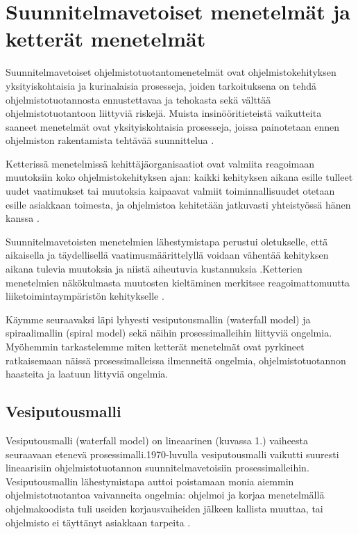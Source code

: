 \documentclass[finnish]{tktltiki2}
\theoremstyle{definition}
\theoremstyle{remark}
\begin{document}
\section{Suunnitelmavetoiset menetelmät ja ketterät menetelmät}

Suunnitelmavetoiset ohjelmistotuotantomenetelmät ovat ohjelmistokehityksen yksityiskohtaisia ja kurinalaisia prosesseja, joiden tarkoituksena on tehdä ohjelmistotuotannosta ennustettavaa ja tehokasta sekä välttää ohjelmistotuotantoon liittyviä riskejä. Muista insinööritieteistä vaikutteita saaneet menetelmät ovat yksityiskohtaisia prosesseja, joissa painotetaan ennen ohjelmiston rakentamista tehtävää  suunnittelua \cite{FOW01a}.

Ketterissä menetelmissä kehittäjäorganisaatiot ovat valmiita reagoimaan muutoksiin koko ohjelmistokehityksen ajan: kaikki kehityksen aikana esille tulleet uudet vaatimukset tai muutoksia kaipaavat valmiit toiminnallisuudet otetaan esille asiakkaan toimesta, ja ohjelmistoa kehitetään jatkuvasti yhteistyössä hänen kanssa \cite{WIC03}.

Suunnitelmavetoisten menetelmien lähestymistapa perustui oletukselle, että aikaisella ja täydellisellä vaatimusmäärittelyllä voidaan vähentää kehityksen aikana tulevia muutoksia ja niistä aiheutuvia kustannuksia .Ketterien menetelmien näkökulmasta muutosten kieltäminen merkitsee reagoimattomuutta liiketoimintaympäristön kehitykselle \cite{HIC01}.


Käymme seuraavaksi läpi lyhyesti vesiputousmallin (waterfall model) ja spiraalimallin (spiral model) sekä näihin prosessimalleihin liittyviä ongelmia. Myöhemmin tarkastelemme miten ketterät menetelmät ovat pyrkineet ratkaisemaan näissä prosessimalleissa ilmenneitä ongelmia, ohjelmistotuotannon haasteita ja laatuun littyviä ongelmia.

\subsection{Vesiputousmalli}

Vesiputousmalli (waterfall model) on lineaarinen (kuvassa 1.) vaiheesta seuraavaan etenevä prosessimalli.1970-luvulla vesiputousmalli vaikutti suuresti lineaarisiin ohjelmistotuotannon suunnitelmavetoisiin prosessimalleihin. Vesiputousmallin lähestymistapa auttoi poistamaan monia aiemmin ohjelmistotuotantoa vaivanneita ongelmia: ohjelmoi ja korjaa menetelmällä ohjelmakoodista tuli useiden korjausvaiheiden jälkeen kallista muuttaa, tai ohjelmisto ei täyttänyt asiakkaan tarpeita   \cite{BOE88}.
\end{document}
